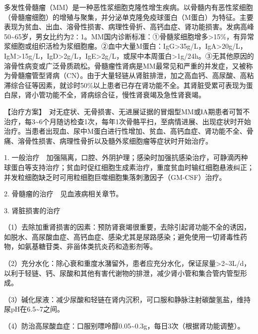 多发性骨髓瘤（MM）是一种恶性浆细胞克隆性增生疾病。以骨髓内有恶性浆细胞（骨髓瘤细胞）的增殖与聚集，并分泌单克隆免疫球蛋白（M蛋白）为特征。主要表现为贫血、出血、溶骨性损害、病理性骨折、高钙血症、肾功能损害。发病高峰50\textasciitilde{}65岁，男女比约为2∶1。MM国内诊断标准：①骨髓浆细胞增多\textgreater{}15\%，有异常浆细胞或组织活检为浆细胞瘤。②血中大量M蛋白：IgG\textgreater{}35g/L，IgA\textgreater{}20g/L，IgM\textgreater{}15g/L，IgD\textgreater{}2g/L，IgE\textgreater{}2g/L，或尿中本周蛋白\textgreater{}1g/24h。③无其他原因的溶骨性病变或广泛骨质疏松。骨髓瘤性肾病是MM最常见和严重的并发症，又被称为骨髓瘤管型肾病（CN）。由于大量轻链从肾脏排泄，加之高血钙、高尿酸、高粘滞综合征等因素，就诊时50\%以上患者已存在肾功能不全。其肾脏受累可表现为蛋白尿，肾小管功能不全，肾病综合征，慢性肾衰竭及急性肾衰竭。

【治疗方案】　对无症状、无骨损害、无进展证据的冒烟型MM或ⅠA期患者可暂不治疗，每3\textasciitilde{}6个月随访检查1次，每年1次骨骼平扫，至病情进展、出现症状时开始治疗。当患者出现血、尿中M蛋白进行性增加、贫血、高钙血症、肾功能不全、骨痛、溶骨性损害、病理性骨折以及髓外浆细胞瘤等症状时开始治疗。

1.
一般治疗　加强隔离，口腔、外阴护理；感染时加强抗感染治疗，可静滴丙种球蛋白等支持治疗；贫血时促红细胞生成素治疗，重度贫血时输红细胞悬液纠正；并发粒细胞缺乏时可用粒细胞巨噬细胞集落刺激因子（GM-CSF）治疗。

2. 骨髓瘤的治疗　见血液病相关章节。

3. 肾脏损害的治疗

（1）去除加重肾损害的因素：预防肾衰竭很重要，去除引起肾功能不全的诱因，如脱水、高尿酸血症、高钙血症、感染尤其是尿路感染；避免使用一切肾毒性药物，如氨基糖苷类、非甾体类抗炎药和造影剂等。

（2）充分水化：除心衰和重度水潴留外，患者应充分水化，保证尿量\textgreater{}2\textasciitilde{}3L/d，以利于轻链、钙、尿酸和其他有害代谢物的排泄，减少肾小管和集合管内管型形成。

（3）碱化尿液：减少尿酸和轻链在肾内沉积，可口服和静脉注射碳酸氢盐，维持尿pH在6.5\textasciitilde{}7之间。

（4）防治高尿酸血症：口服别嘌呤醇0.05\textasciitilde{}0.3g，每日3次（根据肾功能调整）。

